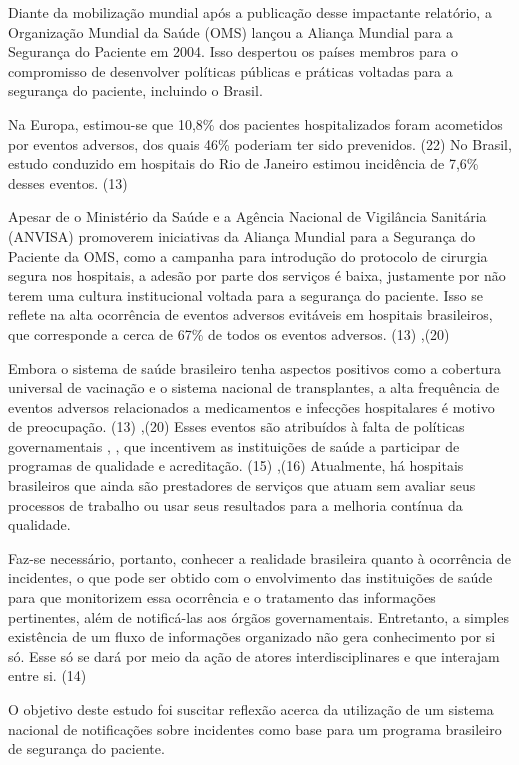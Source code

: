 \documentclass{article}
\begin{document}
Diante da mobilização mundial após a publicação desse impactante relatório, a
Organização
Mundial da Saúde (OMS) lançou a Aliança Mundial para a Segurança do Paciente em
2004.
Isso despertou os países membros para o compromisso de desenvolver políticas
públicas e práticas voltadas para a segurança do paciente, incluindo o Brasil.

Na Europa, estimou-se que 10,8\% dos pacientes hospitalizados foram acometidos
por eventos
adversos, dos quais 46\% poderiam ter sido prevenidos. (22)
No Brasil, estudo conduzido em hospitais do Rio de Janeiro estimou incidência de
7,6\% desses eventos. (13)

Apesar de o Ministério da Saúde e a Agência Nacional de Vigilância Sanitária
(ANVISA)
promoverem iniciativas da Aliança Mundial para a Segurança do Paciente da OMS,
como a
campanha para introdução do protocolo de cirurgia segura nos hospitais, a adesão
por parte
dos serviços é baixa, justamente por não terem uma cultura institucional voltada
para a
segurança do paciente. Isso se reflete na alta ocorrência de eventos adversos
evitáveis em
hospitais brasileiros, que corresponde a cerca de 67\% de todos os eventos
adversos. (13)
,(20)

Embora o sistema de saúde brasileiro tenha aspectos positivos como a cobertura
universal de
vacinação e o sistema nacional de transplantes, a alta frequência de eventos
adversos
relacionados a medicamentos e infecções hospitalares é motivo de preocupação.
(13)
,(20)
Esses eventos são atribuídos à falta de políticas governamentais
,
,
que incentivem as instituições de saúde a participar de programas de qualidade e
acreditação. (15)
,(16)
Atualmente, há hospitais brasileiros que ainda são prestadores de serviços que
atuam
sem avaliar seus processos de trabalho ou usar seus resultados para a melhoria
contínua da
qualidade.

Faz-se necessário, portanto, conhecer a realidade brasileira quanto à ocorrência
de
incidentes, o que pode ser obtido com o envolvimento das instituições de saúde
para que
monitorizem essa ocorrência e o tratamento das informações pertinentes, além de
notificá-las
aos órgãos governamentais. Entretanto, a simples existência de um fluxo de
informações
organizado não gera conhecimento por si só. Esse só se dará por meio da ação de
atores
interdisciplinares e que interajam entre si. (14)

O objetivo deste estudo foi suscitar reflexão acerca da utilização de um sistema
nacional
de notificações sobre incidentes como base para um programa brasileiro de
segurança do
paciente.
\end{document}
